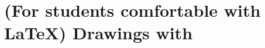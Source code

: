 \documentclass{beamer}
\subtitle{Part 3: Not Just Papers: Presentations \& More}
\begin{document}
\begin{frame}
\titlepage
\end{frame}




\section{(For students comfortable with \LaTeX) Drawings with \protect\tikzname}
\end{document}
